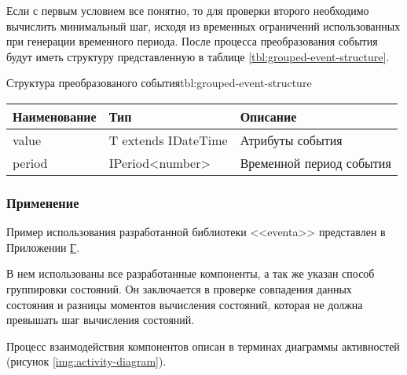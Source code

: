 Если с первым условием все понятно, то для проверки второго необходимо вычислить минимальный шаг, исходя из временных ограничений использованных при генерации временного периода.
После процесса преобразования события будут иметь структуру представленную в таблице \ref{tbl:grouped-event-structure}.

\begin{tblh}{Структура преобразованого события}{tbl:grouped-event-structure}
  \begin{tabularx}{\textwidth}{| p{3cm} | p{4cm} | X |}
    \hline Наименование & Тип                  & Описание                 \\
    \hline value        & T extends IDateTime  & Атрибуты события         \\
    \hline period       & IPeriod<number>      & Временной период события \\
    \hline
    \end{tabularx}
\end{tblh}

\subsubsection{Применение}

Пример использования разработанной библиотеки <<eventa>> \cite{eventa} представлен в Приложении \hyperlink{app:D}{Г}.

В нем использованы все разработанные компоненты, а так же указан способ группировки состояний.
Он заключается в проверке совпадения данных состояния и разницы моментов вычисления состояний, которая не должна превышать шаг вычисления состояний.

Процесс взаимодействия компонентов описан в терминах диаграммы активностей (рисунок \ref{img:activity-diagram}).

